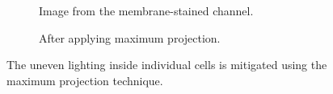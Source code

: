 \documentclass[
  digital,     %
  oneside,     %
  nosansbold,  %
  nocolorbold, %
  lof,         %
  lot,         %
]{fithesis4}
\begin{document}
\begin{figure}
    \begin{subfigure}[t]{0.45\textwidth}
        \centering
        \caption{Image from the membrane-stained channel.}
        \label{fig:max-proj-before}
    \end{subfigure}
    \begin{subfigure}[t]{0.45\linewidth}
        \centering
        \caption{After applying maximum projection.}
    \end{subfigure}
    \caption{The uneven lighting inside individual cells is mitigated using the
    maximum projection technique.}
    \label{fig:max-proj}
\end{figure}
\end{document}
